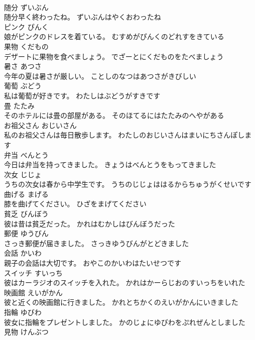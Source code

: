 \documentclass[8pt]{extreport}
\begin{document}
\begin{CJK}{UTF8}{min}
\\	随分	ずいぶん	
\\	随分早く終わったね。	ずいぶんはやくおわったね	
\\	ピンク	ぴんく	
\\	娘がピンクのドレスを着ている。	むすめがぴんくのどれすをきている	
\\	果物	くだもの	
\\	デザートに果物を食べましょう。	でざーとにくだものをたべましょう	
\\	暑さ	あつさ	
\\	今年の夏は暑さが厳しい。	ことしのなつはあつさがきびしい	
\\	葡萄	ぶどう	
\\	私は葡萄が好きです。	わたしはぶどうがすきです	
\\	畳	たたみ	
\\	そのホテルには畳の部屋がある。	そのほてるにはたたみのへやがある	
\\	お祖父さん	おじいさん	
\\	私のお祖父さんは毎日散歩します。	わたしのおじいさんはまいにちさんぽします	
\\	弁当	べんとう	
\\	今日は弁当を持ってきました。	きょうはべんとうをもってきました	
\\	次女	じじょ	
\\	うちの次女は春から中学生です。	うちのじじょははるからちゅうがくせいです	
\\	曲げる	まげる	
\\	膝を曲げてください。	ひざをまげてください	
\\	貧乏	びんぼう	
\\	彼は昔は貧乏だった。	かれはむかしはびんぼうだった	
\\	郵便	ゆうびん	
\\	さっき郵便が届きました。	さっきゆうびんがとどきました	
\\	会話	かいわ	
\\	親子の会話は大切です。	おやこのかいわはたいせつです	
\\	スイッチ	すいっち	
\\	彼はカーラジオのスイッチを入れた。	かれはかーらじおのすいっちをいれた	
\\	映画館	えいがかん	
\\	彼と近くの映画館に行きました。	かれとちかくのえいがかんにいきました	
\\	指輪	ゆびわ	
\\	彼女に指輪をプレゼントしました。	かのじょにゆびわをぷれぜんとしました	
\\	見物	けんぶつ	

\end{CJK}
\end{document}
